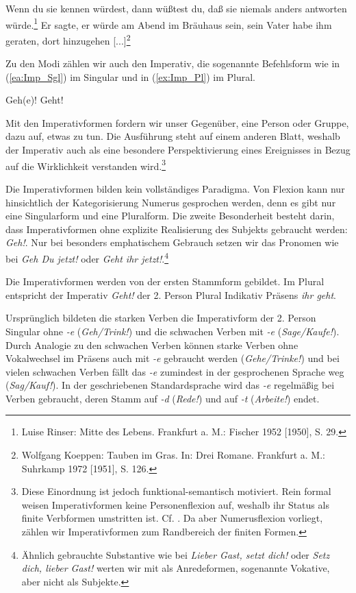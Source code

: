 \ea \label{ea:würde_KII}
\ea \label{ea:würde_Irrealis}  Wenn du sie kennen würdest, dann wüßtest du, daß sie niemals anders antworten würde.\footnote{Luise Rinser: Mitte des Lebens. Frankfurt a. M.: Fischer 1952 [1950], S. 29.}
\ex \label{ex:würde_indRed_Fut} Er sagte, er würde am Abend im Bräuhaus sein, sein Vater habe ihm geraten, dort hinzugehen [...]\footnote{Wolfgang Koeppen: Tauben im Gras. In: Drei Romane. Frankfurt a. M.: Suhrkamp 1972 [1951], S. 126.}
\z 
\z 

\label{subsubsubsection:Imperativ}

Zu den Modi zählen wir auch den Imperativ, die sogenannte Befehlsform wie in (\ref{ea:Imp_Sgl}) im Singular und in (\ref{ex:Imp_Pl}) im Plural. 

\ea \label{ea:Imperativ}
\ea \label{ea:Imp_Sgl} Geh(e)!
\ex \label{ex:Imp_Pl} Geht!
\z 
\z 

Mit den Imperativformen fordern wir unser Gegenüber, eine Person oder Gruppe, dazu auf, etwas zu tun. Die Ausführung steht auf einem anderen Blatt, weshalb der Imperativ auch als eine besondere Perspektivierung eines Ereignisses in Bezug auf die Wirklichkeit verstanden wird.\footnote{Diese Einordnung ist jedoch funktional-semantisch motiviert. Rein formal weisen Imperativformen keine Personenflexion auf, weshalb ihr Status als finite Verbformen umstritten ist. Cf. \citet[212--213]{Eisenberg2020_Wort}. Da aber Numerusflexion vorliegt, zählen wir Imperativformen zum Randbereich der finiten Formen.}

Die Imperativformen bilden kein vollständiges Paradigma. Von Flexion kann nur hinsichtlich der Kategorisierung Numerus gesprochen werden, denn es gibt nur eine Singularform und eine Pluralform. Die zweite Besonderheit besteht darin, dass Imperativformen ohne explizite Realisierung des Subjekts gebraucht werden: \textit{Geh!}. Nur bei besonders emphatischem Gebrauch setzen wir das Pronomen wie bei \textit{Geh Du jetzt!} oder \textit{Geht ihr jetzt!}.\footnote{Ähnlich gebrauchte Substantive wie bei \textit{Lieber Gast, setzt dich!} oder \textit{Setz dich, lieber Gast!} werten wir mit \citet[113--114]{Donhauser1986} als Anredeformen, sogenannte Vokative, aber nicht als Subjekte.}

Die Imperativformen werden von der ersten Stammform gebildet. Im Plural entspricht der Imperativ \textit{Geht!} der 2. Person Plural Indikativ Präsens \textit{ihr geht}.

Ursprünglich bildeten die starken Verben die Imperativform der 2. Person Singular ohne \textit{-e} (\textit{Geh/Trink!}) und die schwachen Verben mit \textit{-e} (\textit{Sage/Kaufe!}). Durch Analogie zu den schwachen Verben können starke Verben ohne Vokalwechsel im Präsens auch mit \textit{-e} gebraucht werden (\textit{Gehe/Trinke!}) und bei vielen schwachen Verben fällt das \textit{-e} zumindest in der gesprochenen Sprache weg (\textit{Sag/Kauf!}). In der geschriebenen Standardsprache wird das \textit{-e} regelmäßig bei Verben gebraucht, deren Stamm auf \textit{-d} (\textit{Rede!}) und auf \textit{-t} (\textit{Arbeite!}) endet. 

